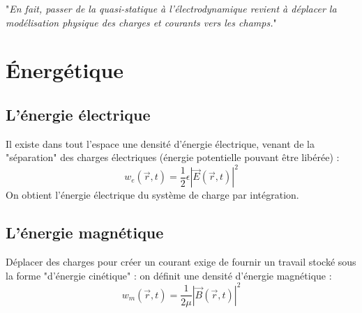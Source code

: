 "\textit{En fait, passer de la quasi-statique à l'électrodynamique revient à déplacer 
la modélisation physique des charges et courants vers les champs.}"


\section{Énergétique}
\subsection{L'énergie électrique}
Il existe dans tout l'espace une densité d'énergie électrique, venant de la "séparation" 
des charges électriques (énergie potentielle pouvant être libérée) :
\begin{equation}
w_e(\vec{r},t) = \frac{1}{2}\epsilon|\vec{E}(\vec{r},t)|^2
\end{equation}
On obtient l'énergie électrique du système de charge par intégration.

\subsection{L'énergie magnétique}
Déplacer des charges pour créer un courant exige de fournir un travail stocké sous 
la forme "d'énergie cinétique" : on définit une densité d'énergie magnétique :
\begin{equation}
w_m(\vec{r},t) = \frac{1}{2\mu}|\vec{B}(\vec{r},t)|^2
\end{equation}
























